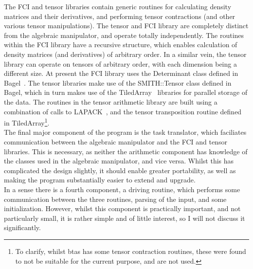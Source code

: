 \noindent The FCI and tensor libraries contain generic routines for calculating
density matrices and their derivatives, and performing tensor contractions (and
other various tensor manipulations). The tensor and FCI library are completely
distinct from the algebraic manipulator, and operate totally independently. The
routines within the FCI library have a recursive structure, which 
enables calculation of density matrices (and
derivatives) of arbitrary order. In a similar vein, the tensor library can
operate on tensors of arbitrary order, with each dimension being a different
size. At present the FCI  library uses the Determinant class defined in
Bagel~\cite{BAGEL}. The tensor libraries make use of the SMITH::Tensor class
defined in Bagel, which in turn makes use of the TiledArray~\cite{TiledArray}
libraries for parallel storage of the data.  The routines in the tensor
arithmetic library are built using a combination of calls to
LAPACK~\cite{LAPACK}, and the tensor transposition routine defined in
TiledArray\footnote{ To clarify, whilst btas has some tensor contraction
routines, these were found to not be suitable for the current purpose, and are
not used.}.\\

\noindent The final major component of the program is the task translator,
which faciliates communication between the algebraic manipulator and the 
FCI and tensor libraries. This is necessary, as
neither the arithmetic component has knowledge of the classes used in
the algebraic manipulator, and vice versa. Whilst this has complicated the
design slightly, it should enable greater portability, as well as making the
program substantially easier to extend and upgrade.\\ 

\noindent In a sense there is a fourth component, a driving routine, which
performs some communication between the three routines, parsing of the input,
and some initialization. However, whilst this component is practically
important, and not particularly small, it is rather simple and of little
interest, so I will not discuss it significantly.

